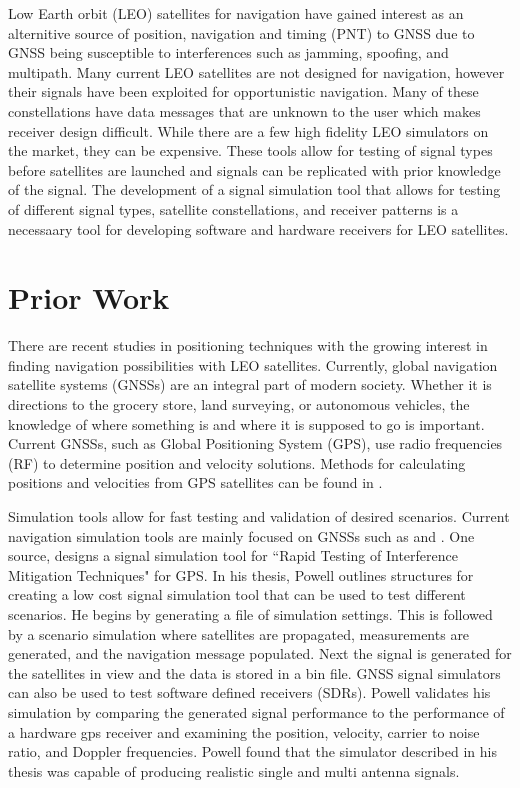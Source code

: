 \documentclass[12pt]{report}
\begin{document}
Low Earth orbit (LEO) satellites for navigation have gained interest as an alternitive source of position, navigation and timing (PNT) to GNSS due to GNSS being susceptible to interferences such as jamming, spoofing, and multipath. Many current LEO satellites are not designed for navigation, however their signals have been exploited for opportunistic navigation. Many of these constellations have data messages that are unknown to the user which makes receiver design difficult. While there are a few high fidelity LEO simulators on the market, they can be expensive. These tools allow for testing of signal types before satellites are launched and signals can be replicated with prior knowledge of the signal. The development of a signal simulation tool that allows for testing of different signal types, satellite constellations, and receiver patterns is a necessaary tool for developing software and hardware receivers for LEO satellites.  

\section { Prior Work }

There are recent studies in positioning techniques with the growing interest in finding navigation possibilities with LEO satellites. Currently, global navigation satellite systems (GNSSs) are an integral part of modern society. Whether it is directions to the grocery store, land surveying, or autonomous vehicles, the knowledge of where something is and where it is supposed to go is important. Current GNSSs, such as Global Positioning System (GPS), use radio frequencies (RF) to determine position and velocity solutions. Methods for calculating positions and velocities from GPS satellites can be found in \cite{misraGlobalPositioningSystem2012}. 

Simulation tools allow for fast testing and validation of desired scenarios. Current navigation simulation tools are mainly focused on GNSSs such as \cite{dongIFGPSSignal2003} and \cite{corbellDesignValidationAccurate2000}. One source, \cite{powellMultipleAntennaSoftwareGPS} designs a signal simulation tool for ``Rapid Testing of Interference Mitigation Techniques" for GPS. In his thesis, Powell outlines structures for creating a low cost signal simulation tool that can be used to test different scenarios. He begins by generating a file of simulation settings. This is followed by a scenario simulation where satellites are propagated, measurements are generated, and the navigation message populated. Next the signal is generated for the satellites in view and the data is stored in a bin file. GNSS signal simulators can also be used to test software defined receivers (SDRs). Powell validates his simulation by comparing the generated signal performance to the performance of a hardware gps receiver and examining the position, velocity, carrier to noise ratio, and Doppler frequencies. Powell found that the simulator described in his thesis was capable of producing realistic single and multi antenna signals. 
\end{document}
